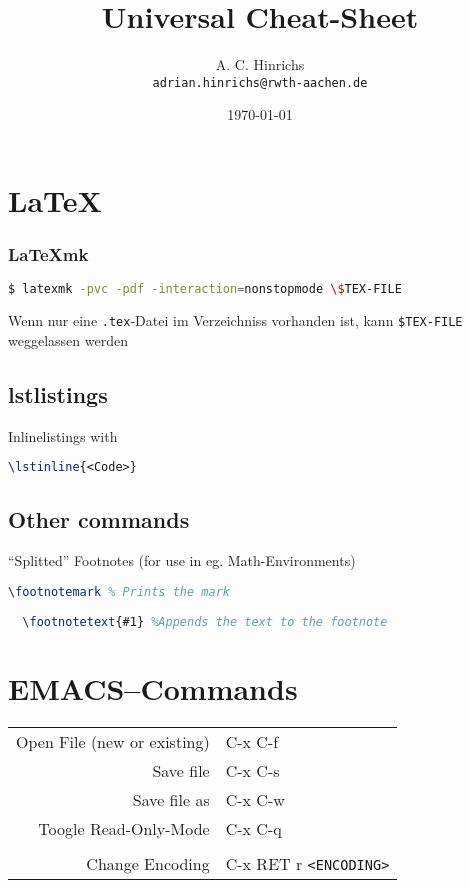 \documentclass[10pt,landscape,a4paper]{CheatSheet}
\title{Universal Cheat-Sheet}
\author{A. C. Hinrichs\\\texttt{adrian.hinrichs@rwth-aachen.de}}
\date{\today}
\begin{document}
\begin{multicols}{4}
  \setlength{\premulticols}{1pt}
  \setlength{\postmulticols}{1pt}
  \setlength{\multicolsep}{1pt}
  \setlength{\columnsep}{2pt}
  \maketitle
  \section{\LaTeX}
  \subsubsection{\LaTeX{}mk}
  \begin{lstlisting}[language=bash]
    $ latexmk -pvc -pdf -interaction=nonstopmode \$TEX-FILE
  \end{lstlisting} %
  
  Wenn nur eine \texttt{.tex}-Datei im Verzeichniss vorhanden ist, kann \texttt{\$TEX-FILE}%
  weggelassen werden\\
  \subsection{lstlistings}
Inlinelistings with
\begin{lstlisting}[language=tex]
\lstinline{<Code>}
\end{lstlisting}
\subsection{Other commands}
\enquote{Splitted} Footnotes (for use in eg. Math-Environments)
\begin{lstlisting}[language=tex]
  \footnotemark % Prints the mark
  
  \footnotetext{#1} %Appends the text to the footnote
\end{lstlisting}

\section{EMACS--Commands}
\begin{xtabular}{rl}
  Open File (new or existing) & C-x C-f\\
  Save file & C-x C-s\\
  Save file as & C-x C-w\\
  Toogle Read-Only-Mode &C-x C-q\\
  \\
  Change Encoding & C-x RET r \texttt{<ENCODING>}\\
\end{xtabular}

\end{multicols}
\end{document}
